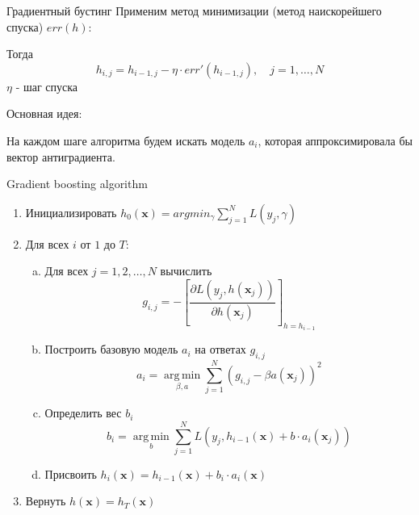 \documentclass[10pt]{beamer}
\DeclareMathOperator*{\argmin}{arg\,min}
\begin{document}
\begin{frame}{Градиентный бустинг}
Применим метод минимизации (метод наискорейшего спуска) $err(h)$:

\vspace{1em}
Тогда
\[
    h_{i,j} = h_{i-1, j} - \eta \cdot err'(h_{i-1, j}), \quad j=1,\ldots,N
\]
$\eta$ - шаг спуска

\vspace{1em}
\begin{block}{Основная идея:}
\end{block}
На каждом шаге алгоритма будем искать модель $a_i$, которая аппроксимировала бы
вектор антиградиента.
\end{frame}

\begin{frame}{Gradient boosting algorithm}
\begin{enumerate}
    \item Инициализировать $h_0(\mathbf{x}) = argmin_{\gamma} \sum \limits_{j=1}^{N} L(y_j, \gamma)$
    \item Для всех $i$ от $1$ до $T$:
        \begin{enumerate}[(a)]
            \item Для всех $j=1,2,\ldots,N$ вычислить
                \[
                    g_{i,j} = - \left[ \frac{\partial L(y_j, h(\mathbf{x}_j))}{\partial
                    h(\mathbf{x}_j)}  \right]_{h=h_{i-1}}
                \]
            \item Построить базовую модель $a_i$ на ответах $g_{i,j}$
                \[
                    a_i = \argmin \limits _{\beta, a} \sum \limits _{j=1}^{N} (g_{i,j} -
                    \beta a(\mathbf{x}_j))^2
                \]
            \item Определить вес $b_i$
                \[
                    b_i = \argmin \limits _b  \sum \limits _{j=1}^N L(y_j,
                    h_{i-1}(\mathbf{x}) + b \cdot a_i(\mathbf{x}_j))
                \]
            \item Присвоить $h_{i}(\mathbf{x}) = h_{i-1}(\mathbf{x}) + b_i \cdot  a_i(\mathbf{x})$
        \end{enumerate}
    \item Вернуть $h(\mathbf{x}) = h_{T}(\mathbf{x})$
\end{enumerate}
\end{frame}
\end{document}
